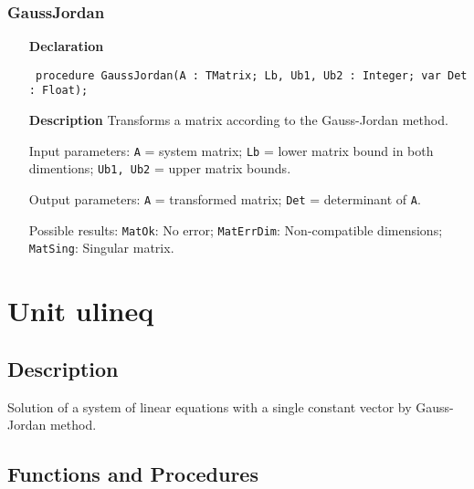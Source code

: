 \documentclass[12pt,a4paper,oneside]{report}
\newcommand{\declarationitem}[1]{\textbf{#1}}
\newcommand{\descriptiontitle}[1]{\textbf{#1}}
\newcommand{\code}[1]{\texttt{#1}}
\begin{document}
\subsubsection{GaussJordan}
\label{ugausjor-GaussJordan}
\begin{itemize}\item[\declarationitem{Declaration}\hfill]
	\begin{flushleft}
		\code{
			procedure GaussJordan(A : TMatrix; Lb, Ub1, Ub2 : Integer; var Det : Float);}
		
	\end{flushleft}
	
	\par
	\item[\descriptiontitle{Description}]
	Transforms a matrix according to the Gauss{-}Jordan method.
	
	Input parameters: \code{A} = system matrix; \code{Lb} = lower matrix bound in both dimentions; \code{Ub1, Ub2} = upper matrix bounds.
	
	Output parameters: \code{A} = transformed matrix; \code{Det} = determinant of \code{A}.
	
	Possible results: \code{MatOk}: No error; \code{MatErrDim}: Non{-}compatible dimensions; \code{MatSing}: Singular matrix.
	
\end{itemize}
\section{Unit ulineq}
\label{ulineq}
\subsection{Description}
Solution of a system of linear equations with a single constant vector by Gauss{-}Jordan method. 
\subsection{Functions and Procedures}
\end{document}
